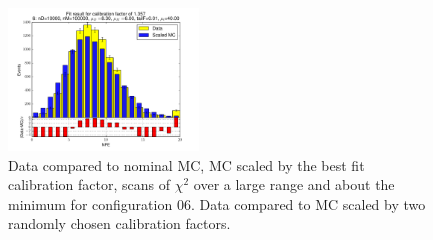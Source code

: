\begin{figure}[htbp]
\begin{center}
\includegraphics[width=0.45\textwidth]{../FIGURES/06/FIG_Fit_result_for_calibration_factor_of_1_357.pdf} 
\caption{Data compared to nominal MC, MC scaled by the best fit calibration factor, scans of $\chi^2$ over a large range and about the minimum for configuration 06. Data compared to MC scaled by two randomly chosen calibration factors.} 
\label{tab:best_06} 
\end{center} \end{figure} 

